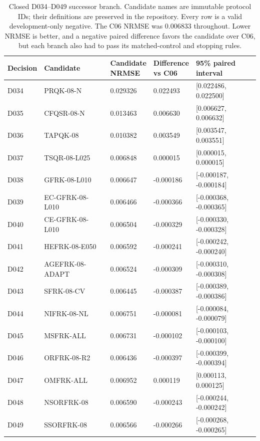\begin{table}[!t]
\caption{Closed D034--D049 successor branch. Candidate names are immutable protocol IDs; their definitions are preserved in the repository. Every row is a valid development-only negative. The C06 NRMSE was 0.006833 throughout. Lower NRMSE is better, and a negative paired difference favors the candidate over C06, but each branch also had to pass its matched-control and stopping rules.}
\label{tab:successor-branch}
\centering
\scriptsize
\setlength{\tabcolsep}{2pt}
\renewcommand{\arraystretch}{0.92}
\begin{tabular}{@{}p{}p{}p{}p{}p{}@{}}
\toprule
Decision & Candidate & \shortstack[l]{Candidate\\NRMSE} & \shortstack[l]{Difference\\vs C06} & \shortstack[l]{95\% paired\\interval} \\
\midrule
D034 & PRQK-08-N & 0.029326 & 0.022493 & [0.022486, 0.022500] \\
D035 & CFQSR-08-N & 0.013463 & 0.006630 & [0.006627, 0.006632] \\
D036 & TAPQK-08 & 0.010382 & 0.003549 & [0.003547, 0.003551] \\
D037 & TSQR-08-L025 & 0.006848 & 0.000015 & [0.000015, 0.000015] \\
D038 & GFRK-08-L010 & 0.006647 & -0.000186 & [-0.000187, -0.000184] \\
D039 & EC-GFRK-08-L010 & 0.006466 & -0.000366 & [-0.000368, -0.000365] \\
D040 & CE-GFRK-08-L010 & 0.006504 & -0.000329 & [-0.000330, -0.000328] \\
D041 & HEFRK-08-E050 & 0.006592 & -0.000241 & [-0.000242, -0.000240] \\
D042 & AGEFRK-08-ADAPT & 0.006524 & -0.000309 & [-0.000310, -0.000308] \\
D043 & SFRK-08-CV & 0.006445 & -0.000387 & [-0.000389, -0.000386] \\
D044 & NIFRK-08-NL & 0.006751 & -0.000081 & [-0.000084, -0.000079] \\
D045 & MSFRK-ALL & 0.006731 & -0.000102 & [-0.000103, -0.000100] \\
D046 & ORFRK-08-R2 & 0.006436 & -0.000397 & [-0.000399, -0.000394] \\
D047 & OMFRK-ALL & 0.006952 & 0.000119 & [0.000113, 0.000125] \\
D048 & NSORFRK-08 & 0.006590 & -0.000243 & [-0.000244, -0.000242] \\
D049 & SSORFRK-08 & 0.006566 & -0.000266 & [-0.000268, -0.000265] \\
\bottomrule
\end{tabular}
\renewcommand{\arraystretch}{1}
\end{table}
